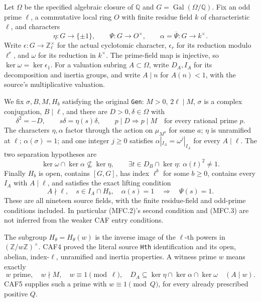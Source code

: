 \documentclass[11pt,a4paper]{article}
\numberwithin{equation}{section}
\theoremstyle{remark}\newtheorem{remark}[theorem]{Remark}
\begin{document}
Let \(\Omega\) be the specified algebraic closure of \(\mathbb Q\)
and \(G=\operatorname{Gal}(\Omega/\mathbb Q)\).  Fix an odd prime
\(\ell\), a commutative local ring \(O\) with finite residue field
\(k\) of characteristic \(\ell\), and characters
\[
 \eta:G\longrightarrow\{\pm1\},\qquad
 \Psi:G\longrightarrow O^\times,\qquad
 \alpha=\overline\Psi:G\longrightarrow k^\times.
\]
Write \(\epsilon:G\to\mathbb Z_\ell^\times\) for the actual
cyclotomic character, \(\epsilon_r\) for its reduction modulo
\(\ell^r\), and \(\omega\) for its reduction in \(k^\times\).
The prime-field map is injective, so
\(\ker\omega=\ker\epsilon_1\).
For a valuation subring \(A\subset\Omega\), write \(D_A,I_A\)
for its decomposition and inertia groups, and write \(A\mid n\)
for \(A(n)<1\), with the source's multiplicative valuation.

We fix \(\sigma,B,M,H_b\) satisfying the original \texttt{Gen}:
\(M>0\), \(2\ell\mid M\), \(\sigma\) is a complex conjugation,
\(B\mid\ell\), and there are \(D>0,\delta\in\Omega\) with
\[
 \delta^2=-D,\qquad s\delta=\eta(s)\delta,
 \qquad p\mid D\Longrightarrow p\mid M
 \quad\text{for every rational prime }p.                  \tag{MFC.1}
\]
The characters \(\eta,\alpha\) factor through the action on
\(\mu_{M^a}\) for some \(a\); \(\eta\) is unramified at
\(\ell\); \(\alpha(\sigma)=1\); and one integer \(j\ge0\)
satisfies \(\alpha|_{I_A}=\omega^j|_{I_A}\) for every
\(A\mid\ell\).  The two separation hypotheses are
\[
 \ker\omega\cap\ker\alpha\not\subseteq\ker\eta,
 \qquad
 \exists t\in D_B\cap\ker\eta:\ \alpha(t)^2\ne1.          \tag{MFC.2}
\]
Finally \(H_b\) is open, contains \([G,G]\), has index
\(\ell^b\) for some \(b\ge0\), contains every \(I_A\) with
\(A\mid\ell\), and satisfies the exact lifting condition
\[
 A\nmid\ell,\quad s\in I_A\cap H_b,\quad\alpha(s)=1
                  \quad\Longrightarrow\quad\Psi(s)=1.      \tag{MFC.3}
\]
These are all nineteen source fields, with the finite residue-field
and odd-prime conditions included.  In particular (MFC.2)'s second
condition and (MFC.3) are not inferred from the weaker CAF entry
conditions.

The subgroup \(H_\theta=H_\theta(w)\) is the inverse image of
the \(\ell\)-th powers in \((\mathbb Z/w\mathbb Z)^\times\).
CAF4 proved the literal source \texttt{Hth} identification and its
open, abelian, index-\(\ell\), unramified and inertia properties.
A witness prime \(w\) means exactly
\[
 w\text{ prime},\quad w\nmid M,\quad w\equiv1\pmod\ell,
 \quad D_A\subseteq\ker\eta\cap\ker\alpha\cap\ker\omega
                     \quad(A\mid w).                       \tag{MFC.4}
\]
CAF5 supplies such a prime with \(w\equiv1\pmod Q\), for every
already prescribed positive \(Q\).
\end{document}
